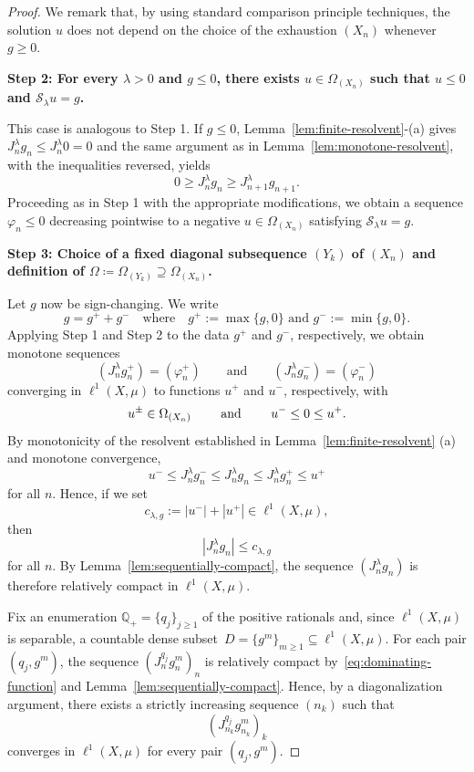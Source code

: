 \documentclass[letterpaper]{article}
\theoremstyle{definition}
\theoremstyle{named}
\numberwithin{equation}{section}
\begin{document}
\begin{proof}
We remark that, by using standard comparison principle techniques, the solution
$u$ does not depend on the choice of the exhaustion $(X_n)$ whenever $g \geq 0$. 

\medskip
\noindent\textbf{Step 2: For every $\lambda>0$ and $g\leq 0$, 
there exists $u\in \Omega_{(X_n)}$ such that $u \leq 0$ and $\mathcal{S}_\lambda u=g $.}

This case is analogous to Step 1. If $g \leq 0$, Lemma~\ref{lem:finite-resolvent}-(a) gives $J^{\lambda}_n g_n \leq J^{\lambda}_n 0 = 0$ and the same argument as 
in Lemma~\ref{lem:monotone-resolvent}, with the inequalities reversed, yields
\[
0 \ge J_n^\lambda g_n \ge J_{n+1}^\lambda g_{n+1}.
\]
Proceeding as in Step 1 with the appropriate modifications, 
we obtain a sequence $\varphi_n \leq 0$ decreasing pointwise to a { negative}
$u \in \Omega_{(X_n)}$ satisfying $\mathcal{S}_\lambda u = g$.



\medskip
\noindent
\textbf{Step 3: Choice of a fixed diagonal subsequence $(Y_k)$  of $(X_n)$ and definition of $\Omega \coloneqq \Omega_{(Y_k)}\supseteq \Omega_{(X_n)}$.}


Let $g$ now be sign-changing. We write
\[
g=g^++g^- \quad \mbox{where} \quad
 g^+:=\max\{g,0\}  \text{ and } 
 g^-:=\min\{g,0\}.
\]
Applying Step 1 and  Step 2 to the data $g^+$ and $g^-$, respectively, we obtain monotone sequences 
$$
(J_n^\lambda g_n^+) = (\varphi_n^+) \qquad \mbox{and} \qquad (J_n^\lambda g_n^-) = (\varphi_n^-)
$$
converging in $\ell^1(X,\mu)$ to functions $u^+$ and $u^-$, respectively, with
\[
u^{\pm}\in \Omega_{(X_n)}
\qquad \textup{ and } \qquad
u^-\leq 0\leq u^+.
\]
By monotonicity of the resolvent established in Lemma~\ref{lem:finite-resolvent} (a) and monotone convergence,
\begin{equation}\label{eq:sandwich}
u^-\leq J_n^\lambda g_n^- \leq J_n^\lambda g_n\leq J_n^\lambda g_n^+ \leq  u^+
\end{equation}
for all $n$.
Hence, if we set
\[
c_{\lambda,g}:=|u^-|+|u^+|\in \ell^1(X,\mu),
\]
then
\begin{equation}\label{eq:dominating-function}
|J_n^\lambda g_n|\leq c_{\lambda,g}
\end{equation}
for all $n$.
By Lemma~\ref{lem:sequentially-compact}, the sequence $(J_n^\lambda g_n)$ is therefore relatively compact in $\ell^1(X,\mu)$.

Fix an enumeration $\mathbb Q_+=\{q_j\}_{j\geq 1}$ of the positive rationals and, since $\ell^1(X,\mu)$ is separable,  a countable dense subset~$D=\{g^m\}_{m\geq 1}\subseteq \ell^1(X,\mu)$. For each pair $(q_j, g^m)$, the sequence $(J_n^{q_j}g_n^m)_n$ is relatively compact by~\eqref{eq:dominating-function} and 
Lemma~\ref{lem:sequentially-compact}. 
Hence, by a diagonalization argument, 
there exists a strictly increasing sequence $(n_k)$ such that
\[
(J_{n_k}^{q_j}g_{n_k}^m)_k
\]
converges in $\ell^1(X,\mu)$ for every pair $(q_j, g^m)$.


\end{proof}
\end{document}
